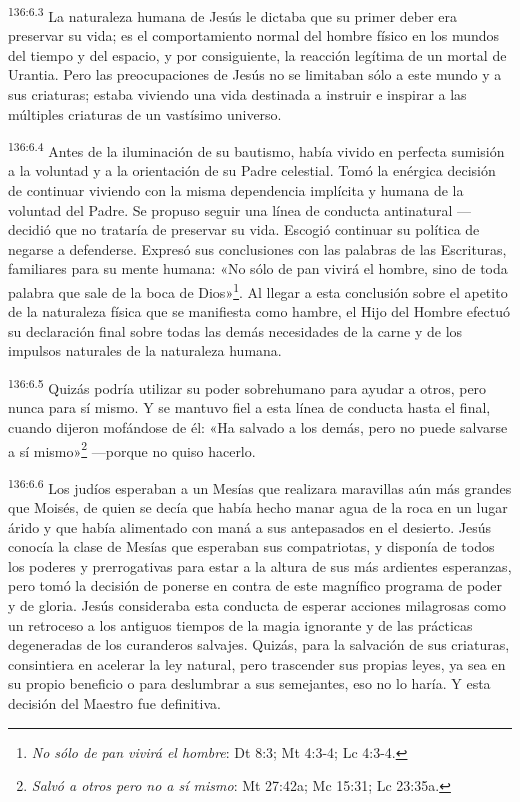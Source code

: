 \par
\textsuperscript{136:6.3} La naturaleza humana de Jesús le dictaba que su primer deber era preservar su vida; es el comportamiento normal del hombre físico en los mundos del tiempo y del espacio, y por consiguiente, la reacción legítima de un mortal de Urantia. Pero las preocupaciones de Jesús no se limitaban sólo a este mundo y a sus criaturas; estaba viviendo una vida destinada a instruir e inspirar a las múltiples criaturas de un vastísimo universo.

\par
\textsuperscript{136:6.4} Antes de la iluminación de su bautismo, había vivido en perfecta sumisión a la voluntad y a la orientación de su Padre celestial. Tomó la enérgica decisión de continuar viviendo con la misma dependencia implícita y humana de la voluntad del Padre. Se propuso seguir una línea de conducta antinatural ---decidió que no trataría de preservar su vida. Escogió continuar su política de negarse a defenderse. Expresó sus conclusiones con las palabras de las Escrituras, familiares para su mente humana: «No sólo de pan vivirá el hombre, sino de toda palabra que sale de la boca de Dios»\footnote{\textit{No sólo de pan vivirá el hombre}: Dt 8:3; Mt 4:3-4; Lc 4:3-4.}. Al llegar a esta conclusión sobre el apetito de la naturaleza física que se manifiesta como hambre, el Hijo del Hombre efectuó su declaración final sobre todas las demás necesidades de la carne y de los impulsos naturales de la naturaleza humana.

\par
\textsuperscript{136:6.5} Quizás podría utilizar su poder sobrehumano para ayudar a otros, pero nunca para sí mismo. Y se mantuvo fiel a esta línea de conducta hasta el final, cuando dijeron mofándose de él: «Ha salvado a los demás, pero no puede salvarse a sí mismo»\footnote{\textit{Salvó a otros pero no a sí mismo}: Mt 27:42a; Mc 15:31; Lc 23:35a.} ---porque no quiso hacerlo.

\par
\textsuperscript{136:6.6} Los judíos esperaban a un Mesías que realizara maravillas aún más grandes que Moisés, de quien se decía que había hecho manar agua de la roca en un lugar árido y que había alimentado con maná a sus antepasados en el desierto. Jesús conocía la clase de Mesías que esperaban sus compatriotas, y disponía de todos los poderes y prerrogativas para estar a la altura de sus más ardientes esperanzas, pero tomó la decisión de ponerse en contra de este magnífico programa de poder y de gloria. Jesús consideraba esta conducta de esperar acciones milagrosas como un retroceso a los antiguos tiempos de la magia ignorante y de las prácticas degeneradas de los curanderos salvajes. Quizás, para la salvación de sus criaturas, consintiera en acelerar la ley natural, pero trascender sus propias leyes, ya sea en su propio beneficio o para deslumbrar a sus semejantes, eso no lo haría. Y esta decisión del Maestro fue definitiva.

